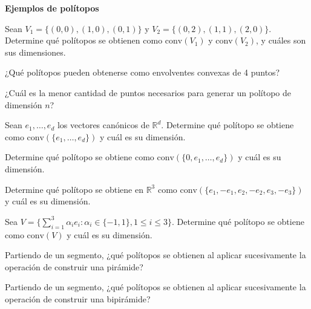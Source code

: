 \documentclass[a4paper,12pt]{article}
\renewcommand{\conv}[1]{\mathrm{conv}(#1)}
\begin{document}
\noindent\textbf{Ejemplos de polítopos}

\begin{exerciselist}

\item Sean $V_1 = \{(0,0),(1,0),(0,1)\}$ y $V_2 = \{(0,2),(1,1),(2,0)\}$. Determine qué polítopos se obtienen como $\conv{V_1}$ y $\conv{V_2}$, y cuáles son sus dimensiones.

\item ¿Qué polítopos pueden obtenerse como envolventes convexas de 4 puntos?

\item ¿Cuál es la menor cantidad de puntos necesarios para generar un polítopo de dimensión $n$?

\item Sean $e_1,\dots,e_d$ los vectores canónicos de $\mathbb{R}^d$. Determine qué polítopo se obtiene como $\conv{\{e_1,\dots,e_d\}}$ y cuál es su dimensión.

\item Determine qué polítopo se obtiene como $\conv{\{0, e_1,\dots,e_d\}}$ y cuál es su dimensión.

\item Determine qué polítopo se obtiene en $\mathbb{R}^3$ como $\conv{\{e_1, -e_1, e_2, -e_2, e_3, -e_3\}}$ y cuál es su dimensión.

\item Sea $V = \{\sum_{i=1}^{3} \alpha_i e_i : \alpha_i \in \{-1,1\}, 1 \leq i \leq 3\}$. Determine qué polítopo se obtiene como $\conv{V}$ y cuál es su dimensión.

\item Partiendo de un segmento, ¿qué polítopos se obtienen al aplicar sucesivamente la operación de construir una pirámide?

\item Partiendo de un segmento, ¿qué polítopos se obtienen al aplicar sucesivamente la operación de construir una bipirámide?


\end{exerciselist}
\end{document}
